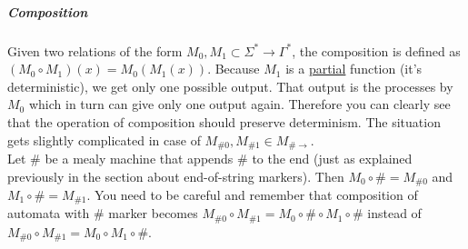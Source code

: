 \documentclass[12pt]{article}
\begin{document}
\subparagraph{Composition} Given two relations of the form $M_0,M_1 \subset \Sigma^* \rightarrow \Gamma^*$, the composition is defined as $(M_0 \circ M_1)(x) = M_0(M_1(x))$. Because $M_1$ is a \underline{partial} function (it's deterministic), we get only one possible output. That output is the processes by $M_0$ which in turn can give only one output again. Therefore you can clearly see that the operation of composition should preserve determinism. The situation gets slightly complicated in case of $M_{\#0},M_{\#1} \in M_{\#\rightarrow}$. \\
Let $\#$ be a mealy machine that appends $\#$ to the end (just as explained previously in the section about end-of-string markers). Then  $M_0 \circ \# = M_{\#0}$ and $M_1 \circ \# = M_{\#1}$. You need to be careful and remember that composition of automata with $\#$ marker becomes $M_{\#0} \circ M_{\#1} = M_0 \circ \# \circ M_1 \circ \#$ instead of  $M_{\#0} \circ M_{\#1} = M_0 \circ M_1 \circ \#$.
\end{document}
